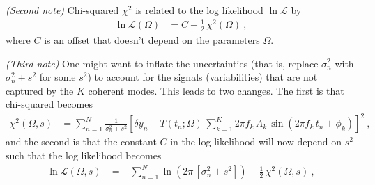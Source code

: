 \documentclass[12pt]{article}
\begin{document}
\textsl{(Second note)}
Chi-squared $\chi^2$ is related to the log likelihood $\ln\mathscr{L}$ by
\begin{align}
    \ln\mathscr{L}(\Omega) &= C - \frac{1}{2}\,\chi^2(\Omega) ~,
\end{align}
where $C$ is an offset that doesn't depend on the parameters $\Omega$.

\textsl{(Third note)}
One might want to inflate the uncertainties (that is, replace $\sigma_n^2$ with $\sigma_n^2 + s^2$ for some $s^2$) to account for the signals (variabilities) that are not captured by the $K$ coherent modes.
This leads to two changes.
The first is that chi-squared becomes
\begin{align}
    \chi^2(\Omega,s) &= \sum_{n=1}^N \frac{1}{\sigma_n^2 + s^2}\left[\delta y_n - T(t_n;\Omega)\, \sum_{k=1}^K 2\pi f_k\,A_k\,\sin(2\pi f_k\,t_n + \phi_k)\right]^2 ~,\label{eq:chisquared3}
\end{align}
and the second is that the constant $C$ in the log likelihood will now depend on $s^2$ such that the log likelihood becomes
\begin{align}
    \ln\mathscr{L}(\Omega,s) &= -\sum_{n=1}^N \ln(2\pi\,[\sigma_n^2 + s^2]) - \frac{1}{2}\,\chi^2(\Omega,s) ~,
\end{align}
\end{document}
